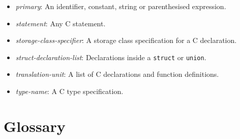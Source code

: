 \documentclass[11pt,letterpaper]{article}
\newcommand{\kw}[1]{{\tt #1}}
\begin{document}
\begin{itemize}
\item \emph{primary}: An identifier, constant, string or parenthesised
expression.

\item \emph{statement}: Any C statement.

\item \emph{storage-class-specifier}: A storage class specification for
a C declaration.

\item \emph{struct-declaration-list}: Declarations inside a \kw{struct}
or \kw{union}.

\item \emph{translation-unit}: A list of C declarations and function
definitions.

\item \emph{type-name}: A C type specification.

\end{itemize}

\section{Glossary}
\label{sec:glossary}
\end{document}
